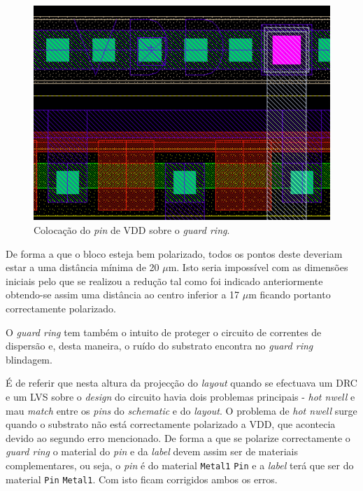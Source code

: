 \documentclass[11pt]{article}
\numberwithin{equation}{section}
\begin{document}
\begin{figure}[H]
	\centering
	\includegraphics[keepaspectratio=true, scale=0.25]{exps/layout/pinVDD}
	\vspace{-0.5em}
	\caption{Colocação do \textit{pin} de VDD sobre o \textit{guard ring}.}
	\vspace{-0.8em}
\end{figure}

De forma a que o bloco esteja bem polarizado, todos os pontos deste deveriam estar a uma distância mínima de 20 $\mu$m. Isto seria impossível com as dimensões iniciais pelo que se realizou a redução tal como foi indicado anteriormente obtendo-se assim uma distância ao centro inferior a 17 $\mu$m ficando portanto correctamente polarizado.

O \textit{guard ring} tem também o intuito de proteger o circuito de correntes de dispersão e, desta maneira, o ruído do substrato encontra no \textit{guard ring} blindagem.

É de referir que nesta altura da projecção do \textit{layout} quando se efectuava um DRC e um LVS sobre o \textit{design} do circuito havia dois problemas principais - \textit{hot nwell} e mau \textit{match} entre os \textit{pins} do \textit{schematic} e do \textit{layout}. O problema de \textit{hot nwell} surge quando o substrato não está correctamente polarizado a VDD, que acontecia devido ao segundo erro mencionado. De forma a que se polarize correctamente o \textit{guard ring} o material do \textit{pin} e da \textit{label} devem assim ser de materiais complementares, ou seja, o \textit{pin} é do material \texttt{Metal1} \texttt{Pin} e a \textit{label} terá que ser do material \texttt{Pin} \texttt{Metal1}. Com isto ficam corrigidos ambos os erros.
\end{document}
